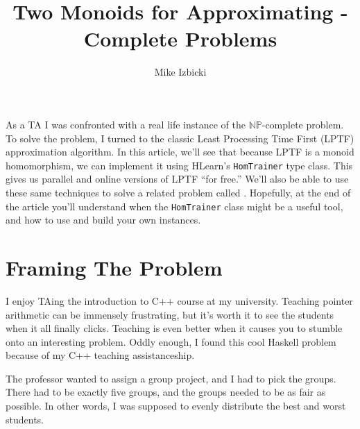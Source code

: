 \documentclass[tikz]{tmr}
\title{Two Monoids for Approximating \np-Complete Problems}
\author{Mike Izbicki\email{mike@izbicki.me}}
\newcommand\h{\lstinline}
\newcommand{\prob}[1]{{\sc {#1}}}
\newcommand{\np}{{\ensuremath{\mathbb{NP}}}}
\newcommand\+{\mdoubleplus}
\begin{document}
\begin{introduction}
As a TA I was confronted with a real life instance of the \np-complete \prob{Scheduling} problem.
To solve the problem, I turned to the classic Least Processing Time First (LPTF) approximation algorithm.
In this article, we'll see that because LPTF is a monoid homomorphism, we can implement it using HLearn's {\upshape\h{HomTrainer}} type class.
This gives us parallel and online versions of LPTF ``for free.''
We'll also be able to use these same techniques to solve a related problem called \prob{BinPacking}.
Hopefully, at the end of the article you'll understand when the {\upshape\h{HomTrainer}} class might be a useful tool, and how to use and build your own instances.
\end{introduction}

\section{Framing The Problem}
I enjoy TAing the introduction to C++ course at my university.
Teaching pointer arithmetic can be immensely frustrating, but it's worth it to see the students when it all finally clicks.  
Teaching is even better when it causes you to stumble onto an interesting problem.  
Oddly enough, I found this cool Haskell problem because of my C++ teaching assistanceship.

The professor wanted to assign a group project, and I had to pick the groups.
There had to be exactly five groups, and the groups needed to be as fair as possible.
In other words, I was supposed to evenly distribute the best and worst students.
\end{document}

